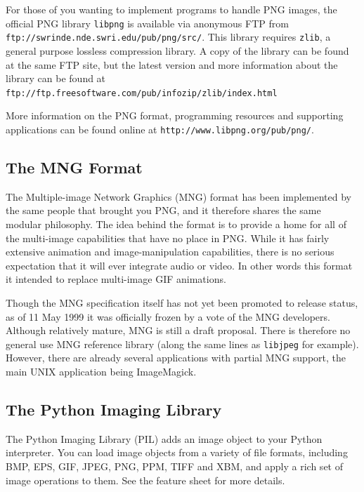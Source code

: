 \documentclass[twoside,11pt]{article}
\newcommand{\htmladdnormallink}[2]{#1}
\newcommand{\htmlref}[2]{#1}
\newcommand{\xlabel}[1]{}
\begin{document}
For those of you wanting to implement programs to handle PNG images, the official PNG library {\tt libpng} is available via anonymous FTP from \htmladdnormallink{{\tt ftp://swrinde.nde.swri.edu/pub/png/src/}}{ftp://swrinde.nde.swri.edu/pub/png/src/}. This library requires {\tt zlib}, a general purpose lossless compression library. A copy of the library can be found at the same FTP site, but the latest version and more information about the library can be found at \htmladdnormallink{{\tt ftp://ftp.freesoftware.com/pub/infozip/zlib/index.html}}{ftp://ftp.freesoftware.com/pub/infozip/zlib/index.html}

More information on the PNG format, programming resources and supporting applications can be found online at \htmladdnormallink{{\tt http://www.libpng.org/pub/png/}}{http://www.libpng.org/pub/png/}.

\subsection{\xlabel{sc15_mng}The MNG Format\label{sc15_mng}}

The \htmladdnormallink{Multiple-image Network Graphics}{http://www.libpng.org/pub/mng/} (MNG) format has been implemented by the same people that brought you PNG, and it therefore shares the same modular philosophy. The idea behind the format is to provide a home for all of the multi-image capabilities that have no place in PNG. While it has fairly extensive animation and image-manipulation capabilities, there is no serious expectation that it will ever integrate audio or video. In other words this format it intended to replace multi-image GIF animations.

Though the MNG specification itself has not yet been promoted to release status, as of 11 May 1999 it was officially frozen by a vote of the MNG developers. Although relatively mature, MNG is still a draft proposal. There is therefore no general use MNG reference library (along the same lines as {\tt libjpeg} for example). However, there are already several applications with partial MNG support, the main UNIX application being  \htmlref{ImageMagick}{sc15_magick}.

\subsection{\xlabel{sc15_pythonimg}The Python Imaging Library\label{sc15_pythonimg}}

The \htmladdnormallink{Python Imaging Library}{http://www.python.org/sigs/image-sig/Imaging.html} (PIL) adds an image object to your Python interpreter. You can load image objects from a variety of file formats, including BMP, EPS, GIF, JPEG, PNG, PPM, TIFF and XBM, and apply a rich set of image operations to them. See the \htmladdnormallink{feature sheet}{http://www.python.org/sigs/image-sig/Features.html}  for more details. 
\end{document}

